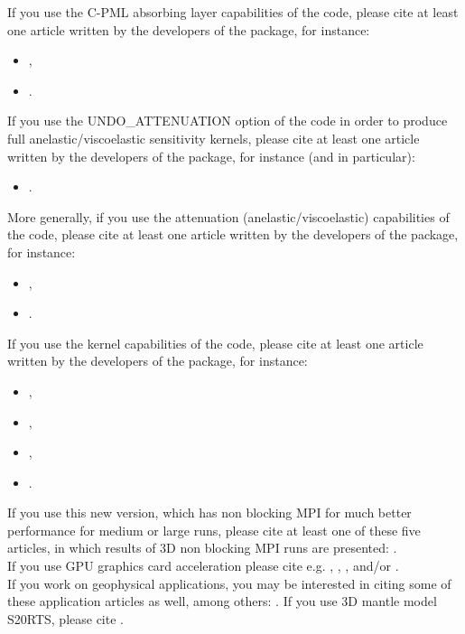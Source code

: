 If you use the C-PML absorbing layer capabilities of the code, please cite at least one article
written by the developers of the package, for instance:
%
\begin{itemize}
\item \cite{XiKoMaMa14},
\item \cite{XiMaCrKoMa16}.
\end{itemize}
%
If you use the UNDO\_ATTENUATION option of the code in order to produce full anelastic/viscoelastic sensitivity kernels, please cite at least one article
written by the developers of the package, for instance (and in particular):
%
\begin{itemize}
\item \cite{KoXiBoPeSaLiTr16}.
\end{itemize}
%
More generally, if you use the attenuation (anelastic/viscoelastic) capabilities of the code, please cite at least one article
written by the developers of the package, for instance:
%
\begin{itemize}
\item \cite{KoXiBoPeSaLiTr16},
\item \cite{BlKoChLoXi16}.
\end{itemize}
%
If you use the kernel capabilities of the code, please cite at least one article
written by the developers of the package, for instance:
%
\begin{itemize}
\item \cite{TrKoLi08},
\item \cite{PeKoLuMaLeCaLeMaLiBlNiBaTr11},
\item \cite{LiTr06},
\item \cite{MoLuTr09}.
\end{itemize}

If you use this new version, which has non blocking MPI for much better performance for medium or large runs,
please cite at least one of these five articles,
in which results of 3D non blocking MPI runs are presented: \cite{KoErGoMi10,KoViCh10,Kom11,PeKoLuMaLeCaLeMaLiBlNiBaTr11,CaKoLaTiMiLeSnTr08}.\\

If you use GPU graphics card acceleration please cite e.g. \cite{Kom11}, \cite{MiKo10}, \cite{KoMiEr09}, and/or \cite{KoErGoMi10}.\\

If you work on geophysical applications, you may be interested in citing some of these application articles as well, among others:
\cite{WiKoScTr04,JiTsKoTr05,KrJiKoTr06a,KrJiKoTr06b,LeChLiKoHuTr08,LeChKoHuTr09,LeKoHuTr09,ChFaKo04,FaChKo04,RiRiKoTrHe02,GoAmTaCaSmSaMaKo09,TrKo00,SaKoTr10}.
If you use 3D mantle model S20RTS, please cite \citet{RiVaWo99}.\\

